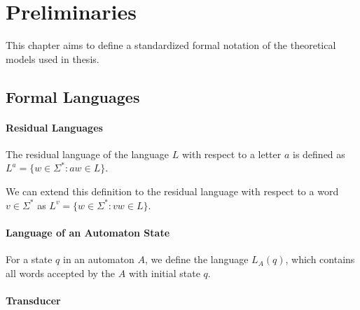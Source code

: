 \chapter{Preliminaries}\label{chapter:preliminaries}
This chapter aims to define a standardized formal notation of the theoretical models used in thesis.


\section{Formal Languages}

\subsubsection{Residual Languages}

The residual language of the language $L$ with respect to a letter $a$ is defined as \break
$L^{a} = \{ w \in \Sigma^{*} : aw \in L \}$.

We can extend this definition to the residual language with respect to a word $v \in \Sigma^{*}$ as \break
$L^{v} = \{ w \in \Sigma^{*} : vw \in L \}$.

\subsubsection{Language of an Automaton State}

For a state $q$ in an automaton $A$, we define the language $L_{A}(q)$, which contains all words accepted by the $A$ with initial state $q$.

\subsubsection{Transducer}

